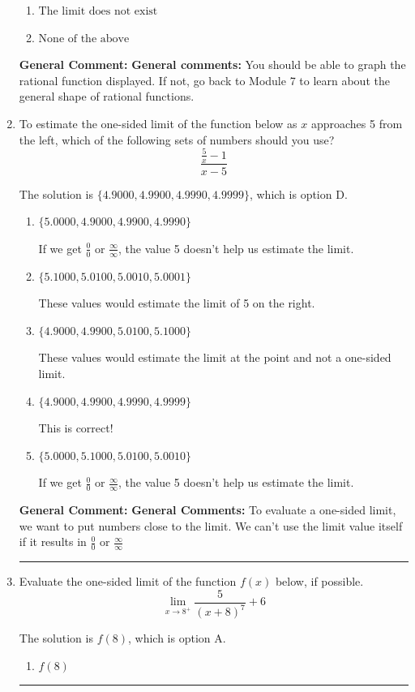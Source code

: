 \documentclass{extbook}[14pt]
\newcommand{\litem}[1]{\item #1

\rule{\textwidth}{0.4pt}}
\begin{document}
\begin{enumerate}
{\begin{enumerate}[label=\Alph*.]
\item \( \text{The limit does not exist} \)


\item \( \text{None of the above} \)


\end{enumerate}

\textbf{General Comment:} \textbf{General comments:} You should be able to graph the rational function displayed. If not, go back to Module 7 to learn about the general shape of rational functions.
}
\litem{
To estimate the one-sided limit of the function below as $x$ approaches 5 from the left, which of the following sets of numbers should you use?
\[ \frac{\frac{5}{x} - 1}{x - 5} \]

The solution is \( \{ 4.9000, 4.9900, 4.9990, 4.9999 \} \), which is option D.\begin{enumerate}[label=\Alph*.]
\item \( \{ 5.0000, 4.9000, 4.9900, 4.9990 \} \)

If we get $\frac{0}{0}$ or $\frac{\infty}{\infty}$, the value 5 doesn't help us estimate the limit.
\item \( \{ 5.1000, 5.0100, 5.0010, 5.0001 \} \)

These values would estimate the limit of 5 on the right.
\item \( \{ 4.9000, 4.9900, 5.0100, 5.1000 \} \)

These values would estimate the limit at the point and not a one-sided limit.
\item \( \{ 4.9000, 4.9900, 4.9990, 4.9999 \} \)

This is correct!
\item \( \{ 5.0000, 5.1000, 5.0100, 5.0010 \} \)

If we get $\frac{0}{0}$ or $\frac{\infty}{\infty}$, the value 5 doesn't help us estimate the limit.
\end{enumerate}

\textbf{General Comment:} \textbf{General Comments:} To evaluate a one-sided limit, we want to put numbers close to the limit. We can't use the limit value itself if it results in $\frac{0}{0}$ or $\frac{\infty}{\infty}$
}
\litem{
Evaluate the one-sided limit of the function $f(x)$ below, if possible.
\[ \lim_{x \rightarrow 8^+} \frac{5}{(x+8)^7}+6 \]

The solution is \( f(8) \), which is option A.\begin{enumerate}[label=\Alph*.]
\item \( f(8) \)



\end{enumerate}}
\end{enumerate}
\end{document}
